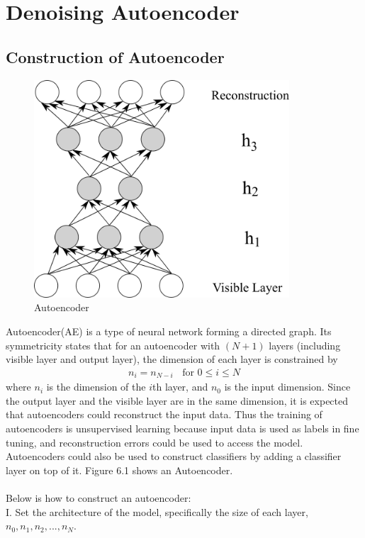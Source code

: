 \documentclass[12pt]{article}
\begin{document}
\section{Denoising Autoencoder}
\subsection{Construction of Autoencoder}
\begin{figure}[h]
\centering
\includegraphics[height=3.2in]{AE.png}
\caption{Autoencoder} \label{fig:side:a}
\end{figure}
Autoencoder(AE) is a type of neural network forming  a directed graph. Its symmetricity states that for an autoencoder with $(N + 1)$ layers (including visible layer and output layer), the dimension of each layer is constrained by \begin{gather}
n_i = n_{N - i}~~~~\text{for }0\leq i\leq N
\end{gather}
where $n_i$ is the dimension of the $i$th layer, and $n_0$ is the input dimension. Since the output layer and the visible layer are in the same dimension, it is expected that autoencoders could reconstruct the input data. Thus the training of autoencoders is unsupervised learning because input data is used as labels in fine tuning, and reconstruction errors could be used to access the model. Autoencoders could also be used to construct classifiers by adding a classifier layer on top of it. Figure 6.1 shows an Autoencoder.\\
\\
Below is how to construct an autoencoder:\\
I. Set the architecture of the model, specifically the size of each layer, \(n_0, n_1, n_2, ..., n_N\).\\
\\
\end{document}
